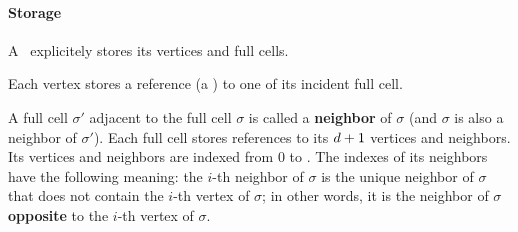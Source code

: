 {{\paragraph{Storage}

A \tds\ explicitely stores its vertices and full cells.

Each vertex stores a reference (a ) to one of its incident
full cell.

A full cell $\sigma'$ adjacent to the full cell $\sigma$ is called
a \textbf{neighbor} of $\sigma$ (and $\sigma$ is also a neighbor of
$\sigma'$). Each full cell stores references to its $d+1$ vertices and
neighbors. Its vertices and neighbors are indexed from $0$ to \cd. The indexes
of its neighbors have the following meaning: the $i$-th neighbor of $\sigma$
is the unique neighbor of $\sigma$ that does not contain the $i$-th vertex of
$\sigma$; in other words, it is the neighbor of $\sigma$ \textbf{opposite} to
the $i$-th vertex of $\sigma$.

}}
